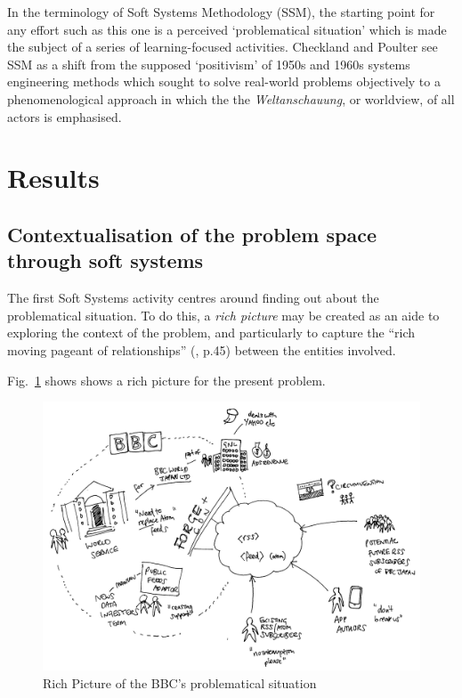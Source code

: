 \documentclass[runningheads,a4paper]{llncs}
\begin{document}
In the terminology of Soft Systems Methodology (SSM), the starting point for any effort such as this one is a perceived `problematical situation' which is made the subject of a series of learning-focused activities. Checkland and Poulter \cite{checkland2006} see SSM as a shift from the supposed `positivism' of 1950s and 1960s systems engineering methods which sought to solve real-world problems objectively to a phenomenological approach in which the the \textit{Weltanschauung}, or worldview, of all actors is emphasised.


\section{Results}

\subsection{Contextualisation of the problem space through soft systems}

The first Soft Systems activity centres around finding out about the problematical situation. To do this, a \textit{rich picture} may be created as an aide to exploring the context of the problem, and particularly to capture the ``rich moving pageant of relationships'' (\cite{checkland1990}, p.45) between the entities involved.

Fig.~\ref{fig:richpicture} shows shows a rich picture for the present problem. 

\begin{figure}
\centering
\includegraphics[width=\textwidth]{richpicture}
\caption{Rich Picture of the BBC's problematical situation}
\label{fig:richpicture}
\end{figure}
\end{document}
